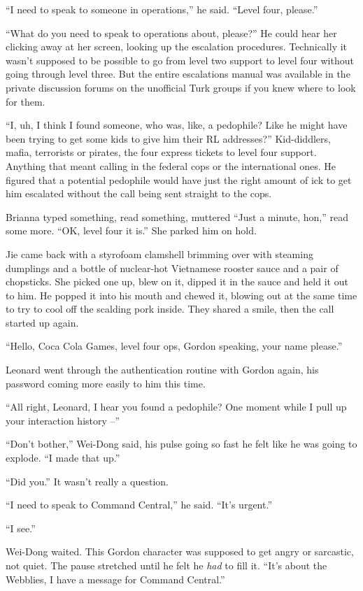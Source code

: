 ``I need to speak to someone in operations,'' he said. ``Level four,
please.''

``What do you need to speak to operations about, please?'' He could
hear her clicking away at her screen, looking up the escalation
procedures. Technically it wasn't supposed to be possible to go
from level two support to level four without going through level
three. But the entire escalations manual was available in the
private discussion forums on the unofficial Turk groups if you knew
where to look for them.

``I, uh, I think I found someone, who was, like, a pedophile? Like
he might have been trying to get some kids to give him their RL
addresses?'' Kid-diddlers, mafia, terrorists or pirates, the four
express tickets to level four support. Anything that meant calling
in the federal cops or the international ones. He figured that a
potential pedophile would have just the right amount of ick to get
him escalated without the call being sent straight to the cops.

Brianna typed something, read something, muttered ``Just a minute,
hon,'' read some more. ``OK, level four it is.'' She parked him on
hold.

Jie came back with a styrofoam clamshell brimming over with
steaming dumplings and a bottle of nuclear-hot Vietnamese rooster
sauce and a pair of chopsticks. She picked one up, blew on it,
dipped it in the sauce and held it out to him. He popped it into
his mouth and chewed it, blowing out at the same time to try to
cool off the scalding pork inside. They shared a smile, then the
call started up again.

``Hello, Coca Cola Games, level four ops, Gordon speaking, your name
please.''

Leonard went through the authentication routine with Gordon again,
his password coming more easily to him this time.

``All right, Leonard, I hear you found a pedophile? One moment while
I pull up your interaction history --''

``Don't bother,'' Wei-Dong said, his pulse going so fast he felt like
he was going to explode. ``I made that up.''

``Did you.'' It wasn't really a question.

``I need to speak to Command Central,'' he said. ``It's urgent.''

``I see.''

Wei-Dong waited. This Gordon character was supposed to get angry or
sarcastic, not quiet. The pause stretched until he felt he
\emph{had} to fill it. ``It's about the Webblies, I have a message
for Command Central.''

